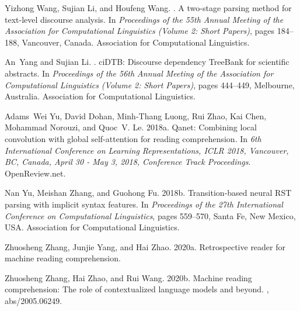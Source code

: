 \documentclass[11pt]{article}
\begin{document}
\begin{thebibliography}{}
Yizhong Wang, Sujian Li, and Houfeng Wang.
.
\newblock A two-stage parsing method for text-level discourse analysis.
\newblock In {\em Proceedings of the 55th Annual Meeting of the Association for
  Computational Linguistics (Volume 2: Short Papers)}, pages 184--188,
  Vancouver, Canada. Association for Computational Linguistics.

An~Yang and Sujian Li.
.
ci{DTB}: Discourse dependency {T}ree{B}ank for scientific
  abstracts.
\newblock In {\em Proceedings of the 56th Annual Meeting of the Association for
  Computational Linguistics (Volume 2: Short Papers)}, pages 444--449,
  Melbourne, Australia. Association for Computational Linguistics.

Adams~Wei Yu, David Dohan, Minh{-}Thang Luong, Rui Zhao, Kai Chen, Mohammad
  Norouzi, and Quoc~V. Le.
\newblock 2018a.
\newblock Qanet: Combining local convolution with global self-attention for
  reading comprehension.
\newblock In {\em 6th International Conference on Learning Representations,
  {ICLR} 2018, Vancouver, BC, Canada, April 30 - May 3, 2018, Conference Track
  Proceedings}. OpenReview.net.

Nan Yu, Meishan Zhang, and Guohong Fu.
\newblock 2018b.
\newblock Transition-based neural {RST} parsing with implicit syntax features.
\newblock In {\em Proceedings of the 27th International Conference on
  Computational Linguistics}, pages 559--570, Santa Fe, New Mexico, USA.
  Association for Computational Linguistics.

Zhuosheng Zhang, Junjie Yang, and Hai Zhao.
\newblock 2020a.
\newblock Retrospective reader for machine reading comprehension.

Zhuosheng Zhang, Hai Zhao, and Rui Wang.
\newblock 2020b.
\newblock Machine reading comprehension: The role of contextualized language
  models and beyond.
, abs/2005.06249.

\end{thebibliography}
 
\end{document}
